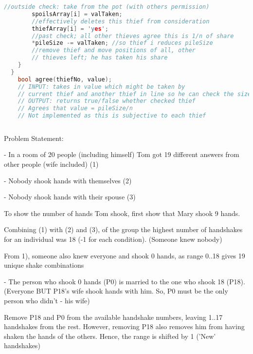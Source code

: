 \documentclass[11pt, a4paper]{article}
\begin{document}
  \vspace{20mm}

\begin{lstlisting}[frame = single, language =c]
        //outside check: take from the pot (with others permission) 
        spoilsArray[i] = valTaken; 
        //effectively deletes this thief from consideration 
        thiefArray[i] = 'yes'; 
        //past check; all other thieves agree this is 1/n of share 
        *pileSize -= valTaken; //so thief i reduces pileSize 
        //remove thief and move positions of all, other 
        // thieves left; he has taken his share 
    } 
  }
    bool agree(thiefNo, value); 
    // INPUT: takes in value which might be taken by 
    // current thief and another thief in line so he can check the size
    // OUTPUT: returns true/false whether checked thief  
    // Agrees that value = pileSize/n 
    // Not implemented as this is subjective to each thief 
    
  \end{lstlisting}


 Problem Statement:

    - In a room of 20 people (including himself) Tom got 19 different answers from other people (wife included) (1)

    - Nobody shook hands with themselves (2)

    - Nobody shook hands with their spouse (3)
    
    To show the number of hands Tom shook, first show that Mary shook 9 hands.

    Combining (1) with (2) and (3), of the group the highest number of handshakes for an individual
    was 18 (-1 for each condition). (Someone knew nobody)

    From 1), someone also knew everyone and shook 0 hands, as range 0..18 gives 19 unique shake combinations 

    - The person who shook 0 hands (P0) is married to the one who shook 18 (P18). 
        (Everyone BUT P18's wife shook hands with him. So, P0 must be the only person who didn't - his wife)
    
    Remove P18 and P0 from the available handshake numbers, leaving 1..17 handshakes from the rest. However, removing P18 also removes him from having shaken the hands of the others. Hence, the range is shifted by 1 ('New' handshakes)
       
\end{document}
